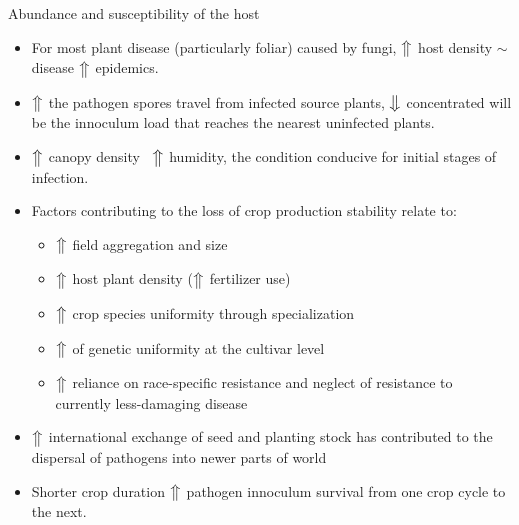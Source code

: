 \documentclass[11pt,dvipsnames,ignorenonframetext,aspectratio=169]{beamer}
\providecommand{\tightlist}{%
  \setlength{\itemsep}{0pt}\setlength{\parskip}{0pt}}
\begin{document}
\begin{frame}{Abundance and susceptibility of the host}
\protect\hypertarget{abundance-and-susceptibility-of-the-host}{}
\small

\begin{itemize}
\tightlist
\item
  For most plant disease (particularly foliar) caused by fungi,
  \(\big\Uparrow\) host density \(\sim\) disease \(\big\Uparrow\)
  epidemics.
\item
  \(\big\Uparrow\) the pathogen spores travel from infected source
  plants, \(\big\Downarrow\) concentrated will be the innoculum load
  that reaches the nearest uninfected plants.
\item
  \(\big\Uparrow\) canopy density \(~\) \(\big\Uparrow\) humidity, the
  condition conducive for initial stages of infection.
\item
  Factors contributing to the loss of crop production stability relate
  to:

  \begin{itemize}
  \tightlist
  \item
    \(\big\Uparrow\) field aggregation and size
  \item
    \(\big\Uparrow\) host plant density (\(\big\Uparrow\) fertilizer
    use)
  \item
    \(\big\Uparrow\) crop species uniformity through specialization
  \item
    \(\big\Uparrow\) of genetic uniformity at the cultivar level
  \item
    \(\big\Uparrow\) reliance on race-specific resistance and neglect of
    resistance to currently less-damaging disease
  \end{itemize}
\item
  \(\big\Uparrow\) international exchange of seed and planting stock has
  contributed to the dispersal of pathogens into newer parts of world
\item
  Shorter crop duration \(\big\Uparrow\) pathogen innoculum survival
  from one crop cycle to the next.
\end{itemize}
\end{frame}
\end{document}

